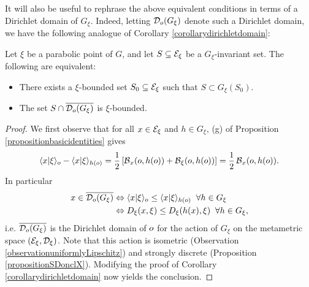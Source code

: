 It will also be useful to rephrase the above equivalent conditions in terms of a Dirichlet domain of $G_\xi$. Indeed, letting $\mathcal D_o(G_\xi)$ denote such a Dirichlet domain, we have the following analogue of Corollary \ref{corollarydirichletdomain}:
\begin{lemma}
Let $\xi$ be a parabolic point of $G$, and let $S\subseteq\mathcal E_\xi$ be a $G_\xi$-invariant set. The following are equivalent:
\begin{itemize}
\item[(A)] There exists a $\xi$-bounded set $S_0\subseteq\mathcal E_\xi$ such that $S\subset G_\xi(S_0)$.
\item[(B)] The set $S\cap\overline{\mathcal D_o(G_\xi)}$ is $\xi$-bounded.
\end{itemize}
\end{lemma}
\begin{proof}
We first observe that for all $x\in \mathcal E_\xi$ and $h\in G_\xi$, (g) of Proposition \ref{propositionbasicidentities} gives
\[
\langle x|\xi\rangle_o - \langle x|\xi\rangle_{h(o)} = \frac12 \left[ \operatorname{\mathcal B}_x(o,h(o)) + \operatorname{\mathcal B}_\xi(o,h(o)) \right] = \frac12 \operatorname{\mathcal B}_x(o,h(o)).
\]
In particular
\begin{align*}
x\in \overline{\mathcal D_o(G_\xi)}
&\Leftrightarrow \langle x|\xi\rangle_o \leq \langle x|\xi\rangle_{h(o)} \;\;\forall h\in G_\xi\\
&\Leftrightarrow D_\xi(x,\xi) \leq D_\xi(h(x),\xi) \;\;\forall h\in G_\xi,
\end{align*}
i.e. $\overline{\mathcal D_o(G_\xi)}$ is the Dirichlet domain of $o$ for the action of $G_\xi$ on the metametric space $(\mathcal E_\xi,\mathcal D_\xi)$. Note that this action is isometric (Observation \ref{observationuniformlyLipschitz}) and strongly discrete (Proposition \ref{propositionSDonclX}). Modifying the proof of Corollary \ref{corollarydirichletdomain} now yields the conclusion.

%

\end{proof}

